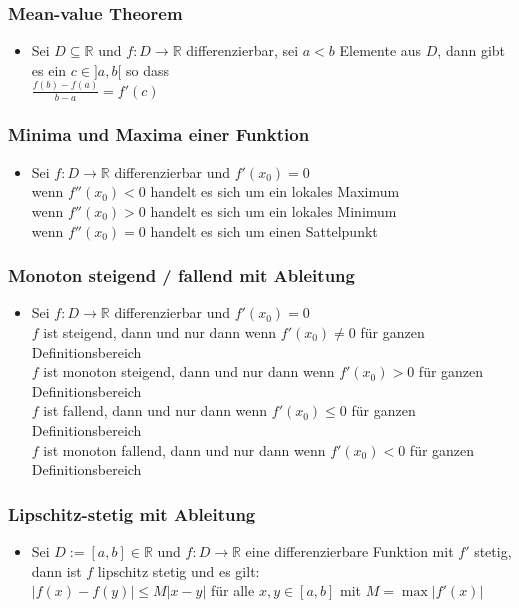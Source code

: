 \documentclass[a3paper, 11pt, landscape]{scrartcl}
\begin{document}
\begin{multicols*}{3}
	\subsubsection{Mean-value Theorem}
	\begin{itemize}
	    \item Sei $D \subseteq\mathbb{R}$ und $f:D\to\mathbb{R}$ differenzierbar, sei $a<b$ Elemente aus $D$, dann gibt es ein $c\in]a,b[$ so dass \\
	    $\frac{f(b)-f(a)}{b-a}=f'(c)$
	\end{itemize}
	
	\subsubsection{Minima und Maxima einer Funktion}
	\begin{itemize}
	    \item Sei $f:D\to\mathbb{R}$ differenzierbar und $f'(x_0)=0$\\
	    wenn $f''(x_0)<0$ handelt es sich um ein lokales Maximum\\
	    wenn $f''(x_0)>0$ handelt es sich um ein lokales Minimum\\
	    wenn $f''(x_0)=0$ handelt es sich um einen Sattelpunkt
	\end{itemize}
	
	\subsubsection{Monoton steigend / fallend mit Ableitung}
	\begin{itemize}
	    \item Sei $f:D\to\mathbb{R}$ differenzierbar und $f'(x_0)=0$\\
	    $f$ ist steigend, dann und nur dann wenn $f'(x_0)\neq 0$ für ganzen Definitionsbereich\\
	    $f$ ist monoton steigend, dann und nur dann wenn $f'(x_0) > 0$ für ganzen Definitionsbereich\\
	    $f$ ist fallend, dann und nur dann wenn $f'(x_0) \leq 0$ für ganzen Definitionsbereich\\
	    $f$ ist monoton fallend, dann und nur dann wenn $f'(x_0) < 0$ für ganzen Definitionsbereich
	\end{itemize}
	
	\subsubsection{Lipschitz-stetig mit Ableitung}
	\begin{itemize}
	    \item Sei $D:=[a,b]\in\mathbb{R}$ und $f:D\to\mathbb{R}$ eine differenzierbare Funktion mit $f'$ stetig, dann ist $f$ lipschitz stetig und es gilt:\\
	    $|f(x)-f(y)| \leq M|x-y|$ für alle $x,y\in [a,b]$ mit $M = \max |f'(x)|$
	\end{itemize}
	

\end{multicols*}
\end{document}
